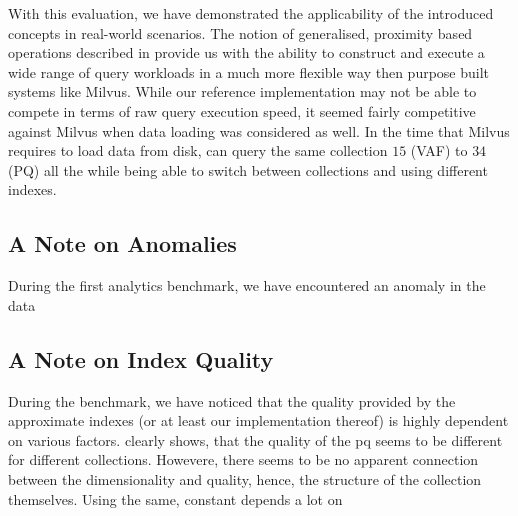 With this evaluation, we have demonstrated the applicability of the introduced concepts in real-world scenarios. The notion of generalised, proximity based operations described in  provide us with the ability to construct and execute a wide range of query workloads in a much more flexible way then purpose built systems like Milvus. While our reference implementation \cottontail{} may not be able to compete in terms of raw query execution speed, it seemed fairly competitive against Milvus when data loading was considered as well. In the time that Milvus requires to load data from disk, \cottontail{} can query the same collection $15$ (VAF) to $34$ (PQ) all the while being able to switch between collections and using different indexes.


\subsection{A Note on Anomalies}
During the first analytics benchmark, we have encountered an anomaly in the data 

\subsection{A Note on Index Quality}
During the benchmark, we have noticed that the quality provided by the approximate indexes (or at least our implementation thereof) is highly dependent on various factors.  clearly shows, that the quality of the \acrshort{pq} seems to be different for different collections. Howevere, there seems to be no apparent connection between the dimensionality and quality, hence, the structure of the collection themselves. Using the same, constant  depends a lot on 
